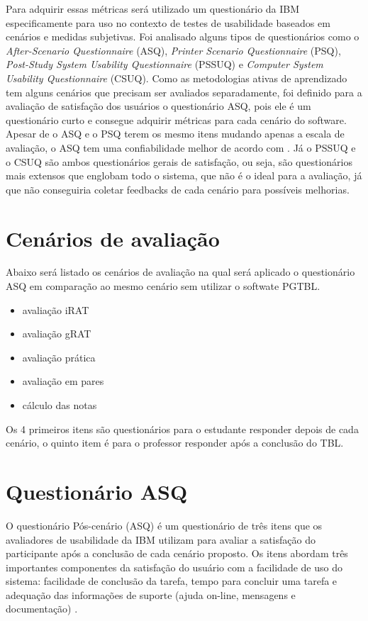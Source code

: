 Para adquirir essas métricas será utilizado um questionário da IBM especificamente para uso no contexto de testes de
usabilidade baseados em cenários e medidas subjetivas. Foi analisado alguns tipos de questionários como o
\textit{After-Scenario Questionnaire} (ASQ), \textit{Printer Scenario Questionnaire} (PSQ), \textit{Post-Study System
Usability Questionnaire} (PSSUQ) e \textit{Computer System Usability Questionnaire} (CSUQ). Como as metodologias ativas
de aprendizado tem alguns cenários que precisam ser avaliados separadamente, foi definido para a avaliação de satisfação
dos usuários o questionário ASQ, pois ele é um questionário curto e consegue adquirir métricas para cada cenário do
software. Apesar de o ASQ e o PSQ terem os mesmo itens mudando apenas a escala de avaliação, o ASQ tem uma
confiabilidade melhor de acordo com \cite{questionario}. Já o PSSUQ e o CSUQ são ambos questionários gerais de
satisfação, ou seja, são questionários mais extensos que englobam todo o sistema, que não é o ideal para a avaliação, já
que não conseguiria coletar feedbacks de cada cenário para possíveis melhorias.

\section{Cenários de avaliação}

Abaixo será listado os cenários de avaliação na qual será aplicado o questionário ASQ em comparação ao mesmo cenário sem
utilizar o softwate PGTBL.

\begin{itemize}
  \item avaliação iRAT
  \item avaliação gRAT
  \item avaliação prática
  \item avaliação em pares
  \item cálculo das notas
\end{itemize}

Os 4 primeiros itens são questionários para o estudante responder depois de cada cenário, o quinto item é
para o professor responder após a conclusão do TBL.

\section{Questionário ASQ}

O questionário Pós-cenário (ASQ) é um questionário de três itens que os avaliadores de usabilidade da IBM utilizam para
avaliar a satisfação do participante após a conclusão de cada cenário proposto. Os itens abordam três importantes
componentes da satisfação do usuário com a facilidade de uso do sistema: facilidade de conclusão da tarefa, tempo para
concluir uma tarefa e adequação das informações de suporte (ajuda on-line, mensagens e documentação)
\cite{questionario}.

